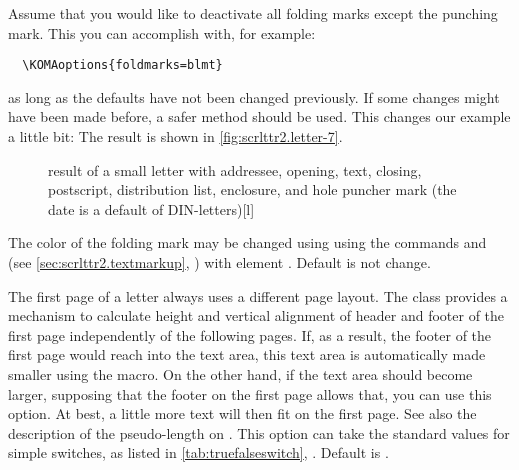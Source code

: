 %
\begin{Example}
  Assume that you would like to deactivate all folding marks except the punching
  mark.  This you can accomplish with, for example:
\begin{lstlisting}
  \KOMAoptions{foldmarks=blmt}
\end{lstlisting}
  as long as the defaults have not been changed previously. If some changes
  might have been made before, a safer method should be used. This changes our
  example a little bit:
  The result is shown in \autoref{fig:scrlttr2.letter-7}.
  \begin{figure}
    \setcapindent{0pt}%
    \begin{captionbeside}{%
        result of a small letter with addressee, opening, text, closing,
        postscript, distribution list, enclosure, and hole puncher mark
        (the date is a default of DIN-letters)}[l]
    \end{captionbeside}
    \label{fig:scrlttr2.letter-7}
  \end{figure}
\end{Example}
%
The color of the folding mark may be changed
using using the commands
 and  (see
\autoref{sec:scrlttr2.textmarkup},
) with element
. Default is not change.%
%
%
\EndIndexGroup


\begin{Declaration}
\end{Declaration}
The first page of a letter always uses a different page layout. The
 class provides a mechanism to calculate height and vertical
alignment of header and footer of the first page independently of the
following pages. If, as a result, the footer of the first page would reach
into the text area, this text area is automatically made smaller using the
 macro. On the other hand, if
the text area should become larger, supposing that the footer on the first
page allows that, you can use this option. At best, a little more text will
then fit on the first page. See also the description of the pseudo-length
 on
.  This option can
take the standard values for simple switches, as listed in
\autoref{tab:truefalseswitch}, . Default is
.
%
\EndIndexGroup


